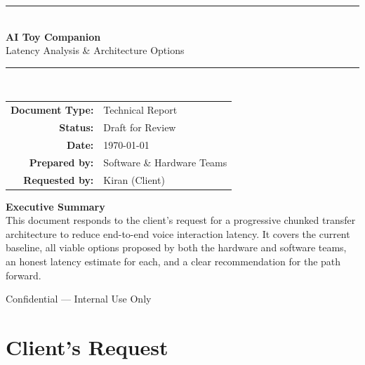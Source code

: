 \documentclass[12pt,a4paper]{article}
\begin{document}
\begin{titlepage}
  \centering
  \vspace*{2cm}
  {\color{primary}\rule{\linewidth}{1.5pt}}\\[0.4cm]
  {\Huge\bfseries\color{primary} AI Toy Companion}\\[0.3cm]
  {\LARGE\color{darkgray} Latency Analysis \& Architecture Options}\\[0.3cm]
  {\color{primary}\rule{\linewidth}{1.5pt}}\\[1.5cm]

  \begin{tabular}{rl}
    \textbf{Document Type:}   & Technical Report \\[4pt]
    \textbf{Status:}          & Draft for Review \\[4pt]
    \textbf{Date:}            & \today \\[4pt]
    \textbf{Prepared by:}     & Software \& Hardware Teams \\[4pt]
    \textbf{Requested by:}    & Kiran (Client) \\
  \end{tabular}

  \vspace{2cm}
  \begin{mdframed}[backgroundcolor=lightgray, linewidth=0pt, roundcorner=6pt,
    innerleftmargin=16pt, innerrightmargin=16pt, innertopmargin=14pt, innerbottommargin=14pt]
    \centering
    \textbf{Executive Summary}\\[6pt]
    \normalsize
    This document responds to the client's request for a progressive chunked transfer architecture
    to reduce end-to-end voice interaction latency. It covers the current baseline, all viable
    options proposed by both the hardware and software teams, an honest latency estimate for each,
    and a clear recommendation for the path forward.
  \end{mdframed}

  \vfill
  {\small\color{darkgray} Confidential — Internal Use Only}
\end{titlepage}

\tableofcontents
\newpage

\section{Client's Request}
\end{document}
